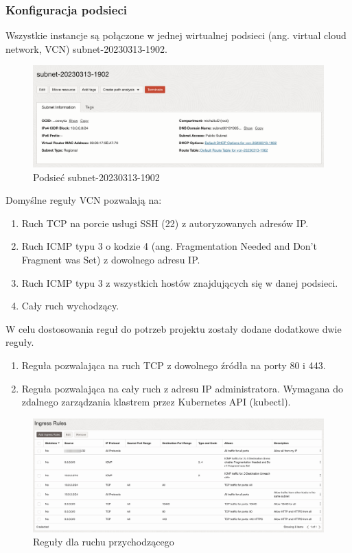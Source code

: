 \subsubsection{Konfiguracja podsieci}

Wszystkie instancje są połączone w jednej wirtualnej podsieci (ang. virtual cloud network, VCN) subnet-20230313-1902.

\begin{figure}[H]
    \centering
    \includegraphics[width=\textwidth]{img/oci-subnet}
    \caption{Podsieć subnet-20230313-1902}
    \label{fig:oci-subnet}
\end{figure}

Domyślne reguły VCN\cite{oci-security-lists} pozwalają na:
\begin{enumerate}
    \item Ruch TCP na porcie usługi SSH (22) z autoryzowanych adresów IP.
    \item Ruch ICMP typu 3 o kodzie 4 (ang. Fragmentation Needed and Don't Fragment was Set) z dowolnego adresu IP.
    \item Ruch ICMP typu 3 z wszystkich hostów znajdujących się w danej podsieci.
    \item Cały ruch wychodzący.
\end{enumerate}

W celu dostosowania reguł do potrzeb projektu zostały dodane dodatkowe dwie reguły.
\begin{enumerate}
    \item Reguła pozwalająca na ruch TCP z dowolnego źródła na porty 80 i 443.
    \item Reguła pozwalająca na cały ruch z adresu IP administratora. Wymagana do zdalnego zarządzania klastrem przez Kubernetes API (kubectl).
\end{enumerate}

\begin{figure}[H]
    \centering
    \includegraphics[width=\textwidth]{img/oci-subnet-ingress-rules}
    \caption{Reguły dla ruchu przychodzącego}
    \label{fig:oci-subnet-ingress-rules}
\end{figure}


